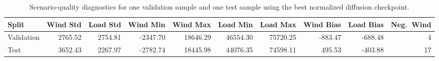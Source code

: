 \begin{table}[t]
  \centering
  \caption{Scenario-quality diagnostics for one validation sample and one test sample using the best normalized diffusion checkpoint.}
  \label{tab:scenario_quality}
  \begin{tabular}{lrrrrrrrrr}
    \toprule
    \textbf{Split} & \textbf{Wind Std} & \textbf{Load Std} & \textbf{Wind Min} & \textbf{Wind Max} & \textbf{Load Min} & \textbf{Load Max} & \textbf{Wind Bias} & \textbf{Load Bias} & \textbf{Neg.\ Wind} \\
    \midrule
    Validation & 2765.52 & 2754.81 & -2347.70 & 18646.29 & 46554.30 & 75720.25 & -883.47 & -688.48 & 4 \\
    Test & 3652.43 & 2267.97 & -2782.74 & 18445.98 & 44076.35 & 74598.11 & 495.53 & -403.88 & 17 \\
    \bottomrule
  \end{tabular}
\end{table}
